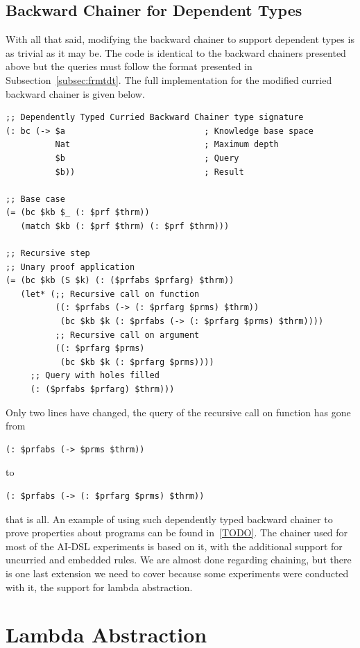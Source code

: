 \documentclass[]{report}
\begin{document}
\subsection{Backward Chainer for Dependent Types}

With all that said, modifying the backward chainer to support
dependent types is as trivial as it may be.  The code is identical to
the backward chainers presented above but the queries must follow the
format presented in Subsection~\ref{subsec:frmtdt}.  The full
implementation for the modified curried backward chainer is given
below.
\begin{verbatim}
;; Dependently Typed Curried Backward Chainer type signature
(: bc (-> $a                            ; Knowledge base space
          Nat                           ; Maximum depth
          $b                            ; Query
          $b))                          ; Result

;; Base case
(= (bc $kb $_ (: $prf $thrm))
   (match $kb (: $prf $thrm) (: $prf $thrm)))

;; Recursive step
;; Unary proof application
(= (bc $kb (S $k) (: ($prfabs $prfarg) $thrm))
   (let* (;; Recursive call on function
          ((: $prfabs (-> (: $prfarg $prms) $thrm))
           (bc $kb $k (: $prfabs (-> (: $prfarg $prms) $thrm))))
          ;; Recursive call on argument
          ((: $prfarg $prms)
           (bc $kb $k (: $prfarg $prms))))
     ;; Query with holes filled
     (: ($prfabs $prfarg) $thrm)))
\end{verbatim}
Only two lines have changed, the query of the recursive call on
function has gone from
\begin{verbatim}
(: $prfabs (-> $prms $thrm))
\end{verbatim}
to
\begin{verbatim}
(: $prfabs (-> (: $prfarg $prms) $thrm))
\end{verbatim}
that is all.  An example of using such dependently typed backward
chainer to prove properties about programs can be found in~\ref{TODO}.
The chainer used for most of the AI-DSL experiments is based on it,
with the additional support for uncurried and embedded rules.  We are
almost done regarding chaining, but there is one last extension we
need to cover because some experiments were conducted with it, the
support for lambda abstraction.

\section{Lambda Abstraction}
\end{document}
